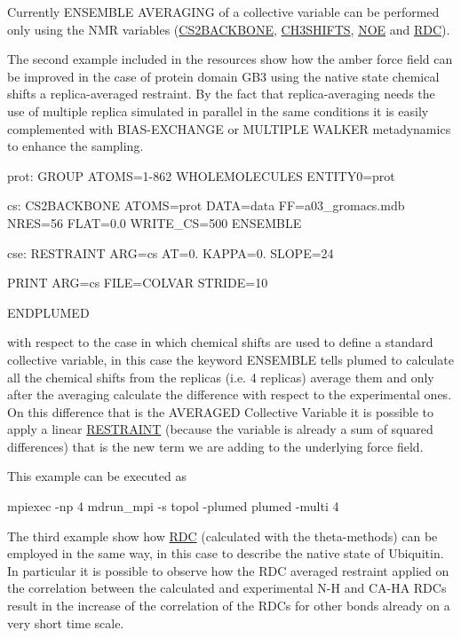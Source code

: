 Currently E\+N\+S\+E\+M\+B\+L\+E A\+V\+E\+R\+A\+G\+I\+N\+G of a collective variable can be performed only using the N\+M\+R variables (\hyperlink{CS2BACKBONE}{C\+S2\+B\+A\+C\+K\+B\+O\+N\+E}, \hyperlink{CH3SHIFTS}{C\+H3\+S\+H\+I\+F\+T\+S}, \hyperlink{NOE}{N\+O\+E} and \hyperlink{RDC}{R\+D\+C}).

The second example included in the resources show how the amber force field can be improved in the case of protein domain G\+B3 using the native state chemical shifts a replica-\/averaged restraint. By the fact that replica-\/averaging needs the use of multiple replica simulated in parallel in the same conditions it is easily complemented with B\+I\+A\+S-\/\+E\+X\+C\+H\+A\+N\+G\+E or M\+U\+L\+T\+I\+P\+L\+E W\+A\+L\+K\+E\+R metadynamics to enhance the sampling.

\begin{DoxyVerb}prot: GROUP ATOMS=1-862
WHOLEMOLECULES ENTITY0=prot

cs: CS2BACKBONE ATOMS=prot DATA=data FF=a03_gromacs.mdb NRES=56 FLAT=0.0 WRITE_CS=500 ENSEMBLE

cse: RESTRAINT ARG=cs AT=0. KAPPA=0. SLOPE=24

PRINT ARG=cs FILE=COLVAR STRIDE=10

ENDPLUMED
\end{DoxyVerb}


with respect to the case in which chemical shifts are used to define a standard collective variable, in this case the keyword E\+N\+S\+E\+M\+B\+L\+E tells plumed to calculate all the chemical shifts from the replicas (i.\+e. 4 replicas) average them and only after the averaging calculate the difference with respect to the experimental ones. On this difference that is the A\+V\+E\+R\+A\+G\+E\+D Collective Variable it is possible to apply a linear \hyperlink{RESTRAINT}{R\+E\+S\+T\+R\+A\+I\+N\+T} (because the variable is already a sum of squared differences) that is the new term we are adding to the underlying force field.

This example can be executed as \begin{DoxyVerb}mpiexec -np 4 mdrun_mpi -s topol -plumed plumed -multi 4
\end{DoxyVerb}


The third example show how \hyperlink{RDC}{R\+D\+C} (calculated with the theta-\/methods) can be employed in the same way, in this case to describe the native state of Ubiquitin. In particular it is possible to observe how the R\+D\+C averaged restraint applied on the correlation between the calculated and experimental N-\/\+H and C\+A-\/\+H\+A R\+D\+Cs result in the increase of the correlation of the R\+D\+Cs for other bonds already on a very short time scale.

